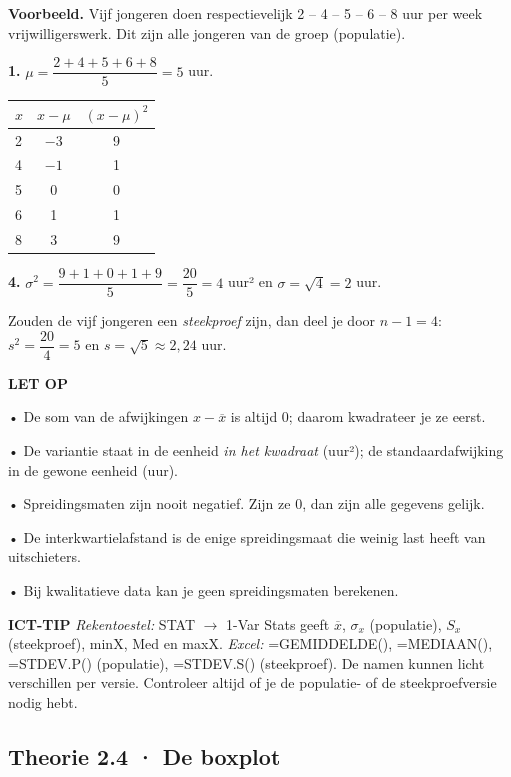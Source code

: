 \begin{voorbeeld}
\textbf{Voorbeeld.} Vijf jongeren doen respectievelijk 2 – 4 – 5 – 6 – 8 uur per week vrijwilligerswerk. Dit zijn alle jongeren van de groep (populatie).

\textbf{1.} $\mu=\dfrac{2+4+5+6+8}{5}=5$ uur.

\begin{tabular}{lcc}
\hline
$x$ & $x-\mu$ & $(x-\mu)^2$ \\
\hline
2 & $-3$ & 9 \\
4 & $-1$ & 1 \\
5 & 0 & 0 \\
6 & 1 & 1 \\
8 & 3 & 9 \\
\hline
\end{tabular}

\textbf{4.} $\sigma^2=\dfrac{9+1+0+1+9}{5}=\dfrac{20}{5}=4$ uur² \quad en \quad $\sigma=\sqrt{4}=2$ uur.

Zouden de vijf jongeren een \emph{steekproef} zijn, dan deel je door $n-1=4$: $s^2=\dfrac{20}{4}=5$ en $s=\sqrt{5}\approx 2{,}24$ uur.
\end{voorbeeld}

\begin{letop}
\textbf{LET OP}

• De som van de afwijkingen $x-\overline{x}$ is altijd 0; daarom kwadrateer je ze eerst.

• De variantie staat in de eenheid \emph{in het kwadraat} (uur²); de standaardafwijking in de gewone eenheid (uur).

• Spreidingsmaten zijn nooit negatief. Zijn ze 0, dan zijn alle gegevens gelijk.

• De interkwartielafstand is de enige spreidingsmaat die weinig last heeft van uitschieters.

• Bij kwalitatieve data kan je geen spreidingsmaten berekenen.
\end{letop}

\begin{ict}
\textbf{ICT-TIP} \quad \emph{Rekentoestel:} STAT $\rightarrow$ 1-Var Stats geeft $\overline{x}$, $\sigma_x$ (populatie), $S_x$ (steekproef), minX, Med en maxX. \emph{Excel:} =GEMIDDELDE(), =MEDIAAN(), =STDEV.P() (populatie), =STDEV.S() (steekproef). De namen kunnen licht verschillen per versie. Controleer altijd of je de populatie- of de steekproefversie nodig hebt.
\end{ict}

\subsection*{Theorie 2.4 · De boxplot}

